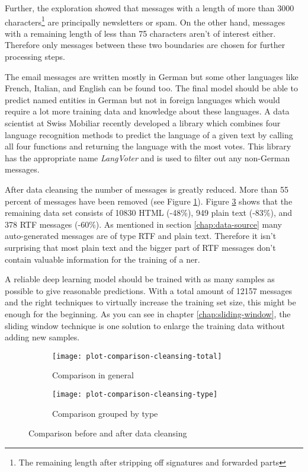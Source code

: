 Further, the exploration showed that messages with a length of more than 3000 characters\footnote{The remaining length after stripping off signatures and forwarded parts} are principally newsletters or spam. On the other hand, messages with a remaining length of less than 75 characters aren't of interest either. Therefore only messages between these two boundaries are chosen for further processing steps.

The email messages are written mostly in German but some other languages like French, Italian, and English can be found too. The final model should be able to predict named entities in German but not in foreign languages which would require a lot more training data and knowledge about these languages. A data scientist at Swiss Mobiliar recently developed a library which combines four language recognition methods to predict the language of a given text by calling all four functions and returning the language with the most votes. This library has the appropriate name
\emph{LangVoter} and is used to filter out any non-German messages.

After data cleansing the number of messages is greatly reduced. More than 55 percent of messages have been removed (see Figure \ref{fig:plot-comparison-cleansing}). Figure \ref{fig:plot-comparison-cleansing-types} shows that the remaining data set consists of 10830 HTML (-48\%), 949 plain text (-83\%), and 378 RTF messages (-60\%). As mentioned in section \ref{chap:data-source} many auto-generated messages are of type RTF and plain text. Therefore it isn't surprising that most plain text and the bigger part of RTF messages don't contain valuable information for the training of a \acrlong{ner}.

A reliable deep learning model should be trained with as many samples as possible to give reasonable predictions. With a total amount of 12157 messages and the right techniques to virtually increase the training set size, this might be enough for the beginning. As you can see in chapter \ref{chap:sliding-window}, the sliding window technique is one solution to enlarge the training data without adding new samples.

\begin{figure}[ht!]
    \begin{subfigure}{0.5\textwidth}
        \texttt{[image: plot-comparison-cleansing-total]}
        \caption{Comparison in general}
        \label{fig:plot-comparison-cleansing}
    \end{subfigure}
    \begin{subfigure}{0.5\textwidth}
        \texttt{[image: plot-comparison-cleansing-type]}
        \caption{Comparison grouped by type}
        \label{fig:plot-comparison-cleansing-types}
    \end{subfigure}
    \caption{Comparison before and after data cleansing}
\end{figure}

